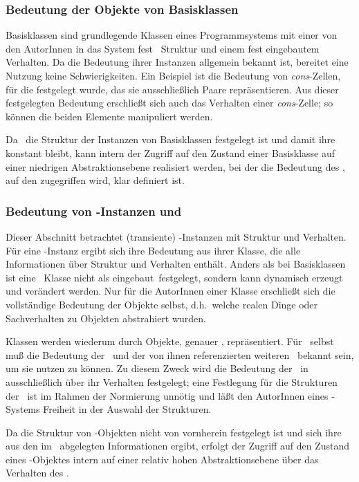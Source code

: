\subsubsection{Bedeutung der Objekte von Basisklassen}
%
Basisklassen sind grundlegende Klassen eines Programmsystems mit einer
von den AutorInnen in das System fest
\ Struktur und einem fest 
eingebautem Verhalten. Da die Bedeutung ihrer Instanzen allgemein
bekannt ist, bereitet eine Nutzung keine Schwierigkeiten.  Ein
Beispiel ist die Bedeutung von {\em cons\/}-Zellen, f\"{u}r die
festgelegt wurde, das sie ausschlie\ss{}lich Paare repr\"{a}sentieren. Aus
dieser festgelegten Bedeutung erschlie\ss{}t sich auch das Verhalten
einer {\em cons\/}-Zelle; so k\"{o}nnen die beiden Elemente manipuliert
werden.
%
\par{}Da \ua\ die Struktur der Instanzen von Basisklassen
festgelegt ist und damit ihre \representationform{} konstant bleibt,
kann intern der Zugriff auf den Zustand einer Basisklasse
auf einer niedrigen Abstraktionsebene realisiert werden, bei der die
Bedeutung des \Slt[s], auf den zugegriffen wird, klar definiert ist.
%
\subsubsection{Bedeutung von \protect\clos-Instanzen und
\protect\mo[en]}
%
Dieser Abschnitt betrachtet (transiente) \clos-Instanzen mit Struktur
und Verhalten.  F\"{u}r eine \clos-Instanz ergibt sich ihre Bedeutung
aus ihrer Klasse, die alle Informationen \"{u}ber Struktur und Verhalten
enth\"{a}lt. Anders als bei Basisklassen ist eine \clos\ Klasse nicht als
\rglq{}eingebaut\rgrq\ festgelegt, sondern kann dynamisch erzeugt und
ver\"{a}ndert werden. Nur f\"{u}r die AutorInnen einer Klasse erschlie\ss{}t
sich die vollst\"{a}ndige Bedeutung der Objekte selbst, d.h.\ welche
realen Dinge oder Sachverhalten zu Objekten abstrahiert wurden.
%
\par{}Klassen werden wiederum durch Objekte, genauer \clsmo[e],
repr\"{a}sentiert. F\"{u}r \clos\ selbst mu\ss{} die Bedeutung der
\clsmo[e]\ und der von ihnen referenzierten weiteren \mo[e]\ bekannt
sein, um sie nutzen zu k\"{o}n\-nen. Zu diesem Zweck wird die Bedeutung der
\mo[e]\ in \cite{bib:amop91} ausschlie\ss{}lich \"{u}ber ihr Verhalten 
festgelegt; eine Festlegung f\"{u}r die Strukturen der
\mo[e]\ ist im Rahmen der Normierung unn\"{o}tig und l\"{a}\ss{}t
den AutorInnen eines \clos-Systems Freiheit in der Auswahl der
Strukturen.
%
\par{}Da die Struktur von \clos-Objekten nicht von vornherein
festgelegt ist und sich ihre \representationform{} aus den im
\clsmo\ abgelegten Informationen ergibt, erfolgt der Zugriff auf den
Zustand eines \clos-Objektes intern auf einer relativ hohen
Abstraktionsebene \"{u}ber das Verhalten des \clsmo[es].
%
